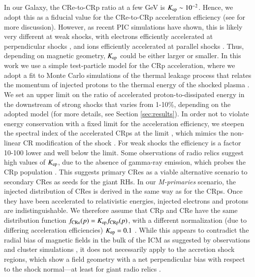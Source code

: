 \documentclass[useAMS,usenatbib]{mn2e}
\begin{document}
In our Galaxy, the CRe-to-CRp ratio at a few GeV is $K_{{\mathrm{ep}}} \sim
10^{-2}$. Hence, we adopt this as a fiducial value for the CRe-to-CRp
acceleration efficiency (see \cite{pinzke13} for more
discussion). However, as recent PIC simulations have shown, this is
likely very different at weak shocks, with electrons efficiently
accelerated at perpendicular shocks
\citep{2014ApJ...794..153G,2014ApJ...797...47G}, and ions efficiently
accelerated at parallel shocks \citep{2014ApJ...783...91C}. Thus,
depending on magnetic geometry, $K_{{\mathrm{ep}}}$ could be either larger
or smaller. In this work we use a simple test-particle model for the
CRp acceleration, where we adopt a fit to Monte Carlo simulations of
the thermal leakage process that relates the momentum of injected
protons to the thermal energy of the shocked plasma \citep{kang11}. We
set an upper limit on the ratio of accelerated proton-to-dissipated
energy in the downstream of strong shocks that varies from 1-10\%,
depending on the adopted model (for more details, see Section
\ref{sec:results}). In order not to violate energy conservation with a
fixed limit for the acceleration efficiency, we steepen the spectral
index of the accelerated CRps at the limit \citep{pinzke13}, which
mimics the non-linear CR modification of the shock
\citep{ellison00}. For weak shocks the efficiency is a factor 10-100
lower and well below the limit. Some observations of radio relics
suggest high values of $K_{{\mathrm{ep}}}$, due to the absence of gamma-ray
emission, which probes the CRp population
\citep{2014MNRAS.437.2291V}. This suggests primary CRes as a viable
alternative scenario to secondary CRes as seeds for the giant RHs. In
our {\em M-primaries} scenario, the injected distribution of CRes is
derived in the same way as for the CRps. Once they have been
accelerated to relativistic energies, injected electrons and protons
are indistinguishable. We therefore assume that CRp and CRe have the
same distribution function $f_{\mathrm{CRe}}(p) = K_{\mathrm{ep}}
f_{\mathrm{CRp}}(p)$, with a different normalization (due to differing
acceleration efficiencies) $K_{\mathrm{ep}}=0.1$ \citep[viable for primarily
perpendicular shocks]{2014ApJ...794..153G}. While this
appears to contradict the radial bias of magnetic fields in the bulk
of the ICM as suggested by observations \citep{2010NatPh...6..520P}
and cluster simulations \citep{2011ApJ...740...81R}, it does not
necessarily apply to the accretion shock regions, which show a field
geometry with a net perpendicular bias with respect to the shock
normal---at least for giant radio relics \citep{2010Sci...330..347V}.
\end{document}
